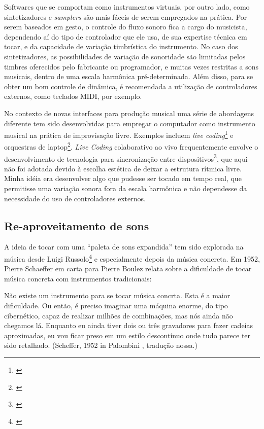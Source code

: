 Softwares que se comportam como instrumentos virtuais, por outro lado, como sintetizadores e \emph{samplers} são mais fáceis de serem empregados na prática. Por serem baseados em gesto, o controle do fluxo sonoro fica a cargo do musicista, dependendo aí do tipo de controlador que ele usa, de sua expertise técnica em tocar, e da capacidade de variação timbrística do instrumento. No caso dos sintetizadores, as possibilidades de variação de sonoridade são limitadas pelos timbres oferecidos pelo fabricante ou programador, e muitas vezes restritas a sons musicais, dentro de uma escala harmônica pré-determinada. Além disso, para se obter um bom controle de dinâmica, é recomendada a utilização de controladores externos, como teclados MIDI, por exemplo. 

No contexto de novas interfaces para produção musical uma série de abordagens diferente tem sido desenvolvidas para empregar o computador como instrumento musical na prática de improvisação livre. Exemplos incluem \emph{live coding}\footnote{\cite{freeman2011collaborative}} e orquestras de laptop\footnote{\cite{Albert2012}}. \emph{Live Coding} colaborativo ao vivo frequentemente envolve o desenvolvimento de tecnologia para sincronização entre dispositivos\footnote{\cite{Wilson2014}}, que aqui não foi adotada devido à escolha estética de deixar a estrutura rítmica livre. Minha idéia era desenvolver algo que pudesse ser tocado em tempo real, que permitisse uma variação sonora fora da escala harmônica e não dependesse da necessidade do uso de controladores externos.


\subsection{Re-aproveitamento de sons}

A ideia de tocar com uma ``paleta de sons expandida'' tem sido explorada na música desde Luigi Russolo\footnote{\cite{Merz2013}} e especialmente depois da música concreta. Em 1952, Pierre Schaeffer em carta para Pierre Boulez relata sobre a dificuldade de tocar música concreta com instrumentos tradicionais: 

\begin{citacao}
Não existe um instrumento para se tocar música concrta. Esta é a maior dificuldade. Ou então, é preciso imaginar uma máquina enorme, do tipo cibernético, capaz de realizar milhões de combinações, mas nós ainda não chegamos lá. Enquanto eu ainda tiver dois ou três gravadores para fazer cadeias aproximadas, eu vou ficar preso em um estilo descontínuo onde tudo parece ter sido retalhado. (Scheffer, 1952 in Palombini \citeyear{Palombini1993}, tradução nossa.)

\end{citacao}


